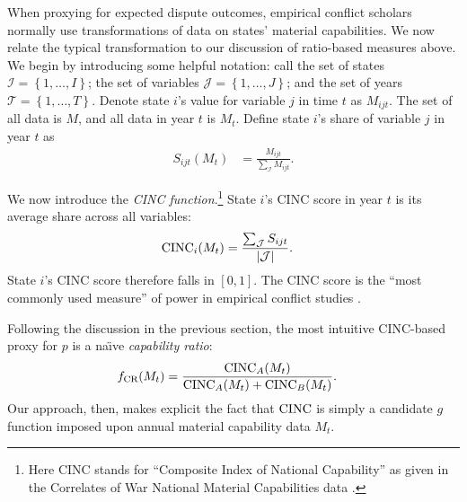 When proxying for expected dispute outcomes, empirical conflict scholars normally use transformations of data on states' material capabilities. 
We now relate the typical transformation to our discussion of ratio-based measures above.
We begin by introducing some helpful notation: call the set of states $\mathcal{I} = \left\{1, \ldots, I\right\}$; the set of variables $\mathcal{J} = \left\{1,\ldots,J\right\}$; and the set of years $\mathcal{T} = \left\{1,\ldots, T\right\}$. 
Denote state $i$'s value for variable $j$ in time $t$ as $M_{ijt}$. 
The set of all data is $M$, and all data in year $t$ is $M_t$.
Define state $i$'s share of variable $j$ in year $t$ as
\begin{align*}
  S_{ijt}(M_{t}) &= \frac{M_{ijt}}{\sum_{\mathcal{I}} M_{ijt}}.
\end{align*}

We now introduce the \emph{CINC function}.\footnote{Here CINC stands for ``Composite Index of National Capability'' as given in the Correlates of War National Material Capabilities data \citep{singer1972}.} 
State $i$'s CINC score in year $t$ is its average share across all variables:
\begin{align*}
  \operatorname{CINC}_i(M_t) &= \frac{\sum_{\mathcal{J}} S_{ijt}}{\left|\mathcal{J}\right|}.
\end{align*}
State $i$'s CINC score therefore falls in $[0,1]$. 
The CINC score is the ``most commonly used measure'' of power in empirical conflict studies \citep[212]{kadera2004}.

Following the discussion in the previous section, the most intuitive CINC-based proxy for $p$ is a na\"{\i}ve \emph{capability ratio}:
\begin{align*}
  f_{\text{CR}}(M_t) &= \frac{\operatorname{CINC}_A(M_t)}{\operatorname{CINC}_A(M_t) + \operatorname{CINC}_B(M_t)}.
\end{align*}
Our approach, then, makes explicit the fact that $\operatorname{CINC}$ is simply a candidate $g$ function imposed upon annual material capability data $M_t$.

